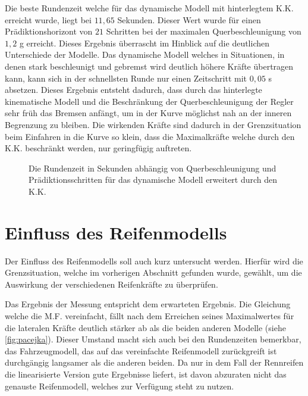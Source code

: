 \documentclass{like}
\begin{document}
Die beste Rundenzeit welche für das dynamische Modell mit hinterlegtem \ac{K.K.} erreicht wurde, liegt bei $11,65$ Sekunden. Dieser Wert wurde für einen Prädiktionshorizont von $21$ Schritten bei der maximalen Querbeschleunigung von $1,2$ g erreicht. Dieses Ergebnis überrascht im Hinblick auf die deutlichen Unterschiede der Modelle. Das dynamische Modell welches in Situationen, in denen stark beschleunigt und gebremst wird deutlich höhere Kräfte übertragen kann, kann sich in der schnellsten Runde nur einen Zeitschritt mit $0,05$ s absetzen. Dieses Ergebnis entsteht dadurch, dass durch das hinterlegte kinematische Modell und die Beschränkung der Querbeschleunigung der Regler sehr früh das Bremsen anfängt, um in der Kurve möglichst nah an der inneren Begrenzung zu bleiben. Die wirkenden Kräfte sind dadurch in der Grenzsituation beim Einfahren in die Kurve so klein, dass die Maximalkräfte welche durch den \ac{K.K.} beschränkt werden, nur geringfügig auftreten.
\begin{figure}
	\centering
	 
	\caption{Die Rundenzeit in Sekunden abhängig von Querbeschleunigung und Prädiktionsschritten für das dynamische Modell erweitert durch den \ac{K.K.}}
	\label{fig:betaMaxFineKam}
\end{figure}

\section{Einfluss des Reifenmodells}
Der Einfluss des Reifenmodells soll auch kurz untersucht werden. Hierfür wird die Grenzsituation, welche im vorherigen Abschnitt gefunden wurde, gewählt, um die Auswirkung der verschiedenen Reifenkräfte zu überprüfen.


\begin{figure}
	\centering
	 
	\caption{}
	\label{fig:tireModelDiff}
\end{figure}

Das Ergebnis der Messung entspricht dem erwarteten Ergebnis. Die Gleichung welche die \ac{M.F.} vereinfacht, fällt nach dem Erreichen seines Maximalwertes für die lateralen Kräfte deutlich stärker ab als die beiden anderen Modelle (siehe \ref{fig:pacejka}). Dieser Umstand macht sich auch bei den Rundenzeiten bemerkbar, das Fahrzeugmodell, das auf das vereinfachte Reifenmodell zurückgreift ist durchgängig langsamer als die anderen beiden. Da nur in dem Fall der Rennreifen die linearisierte Version gute Ergebnisse liefert, ist davon abzuraten nicht das genauste Reifenmodell, welches zur Verfügung steht zu nutzen.    
\end{document}
